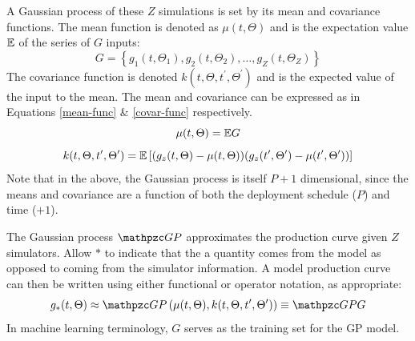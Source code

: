 A Gaussian process of these $Z$ simulations is set by its mean and 
covariance functions. The mean function is denoted as $\mu(t, \Theta)$ and 
is the expectation value $\mathbb{E}$ of 
the series of $G$ inputs:
\begin{equation}
\label{G}
G = \left\{g_1(t, \Theta_1), g_2(t, \Theta_2), \ldots, 
           g_Z(t, \Theta_Z)\right\}
\end{equation}
The covariance function is denoted $k(t, \Theta, t^\prime, \Theta^\prime)$ 
and is the expected value of the input to the mean. The mean and 
covariance can be expressed as
in Equations \ref{mean-func} \& \ref{covar-func} respectively.
\begin{equation}
\label{mean-func}
\mu(t, \Theta) = \mathbb{E} G
\end{equation}
\begin{equation}
\label{covar-func}
k(t, \Theta, t^\prime, \Theta^\prime) = 
    \mathbb{E}\left[(g_z(t, \Theta) - \mu(t, \Theta))
            (g_z(t^\prime, \Theta^\prime) - \mu(t^\prime, \Theta^\prime))
      \right]
\end{equation}
Note that in the above, the Gaussian process is itself $P+1$ dimensional, 
since the means and covariance are a function of both the deployment 
schedule ($P$) and time ($+1$).

The Gaussian process $\GP$ approximates the production curve 
given $Z$ simulators. Allow $*$ to indicate that the a quantity comes from 
the model as opposed to coming from the simulator information. A model 
production curve can then be written using either functional or operator
notation, as appropriate:
\begin{equation}
\label{gp-def-approx}
g_*(t, \Theta) \approx \GP\left(\mu(t, \Theta), 
                                 k(t, \Theta, t^\prime, \Theta^\prime)\right) 
                \equiv \GP G
\end{equation}
In machine learning terminology, $G$ serves as the training set for the 
GP model.

